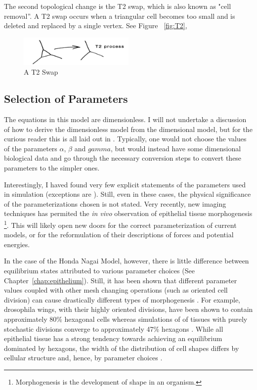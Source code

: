 The second topological change is the T2 swap, which is also known as "cell removal''. A T2 swap occurs when a triangular cell becomes too small and is deleted and replaced by a single vertex. See Figure ~\ref{fig:T2},

\begin{figure}
\centering
\includegraphics[width=0.5\textwidth]{../diagrams/t2.png}
\caption{A T2 Swap}
\label{fig:t2}
\end{figure}

\subsection{Selection of Parameters}

The equations in this model are dimensionless. I will not undertake a discussion of how to derive the dimensionless model from the dimensional model, but for the curious reader this is all laid out in \cite{HondaNagai}. Typically, one would not choose the values of the parameters $\alpha$, $\beta$ and $gamma$, but would instead have some dimensional biological data and go through the necessary conversion steps to convert these parameters to the simpler ones\cite{NewOkuda}.

Interestingly, I haved found very few explicit statements of the parameters used in simulation (exceptions are \cite{WoundHealing}\cite{ChasteMain}\cite{NewOkuda}). Still, even in these cases, the physical significance of the parameterizations chosen is not stated. Very recently, new imaging techniques has permited the \emph{in vivo} observation of epithelial tissue morphogenesis \footnote{Morphogenesis is the development of shape in an organism.}\cite{Sokolow}\cite{Xiong}. This will likely open new doors for the correct parameterization of current models, or for the reformulation of their descriptions of forces and potential energies. 

In the case of the Honda Nagai Model, however, there is little difference between equilibrium states attributed to various parameter choices (See Chapter~\ref{chap:epithelium}). Still, it has been shown that different parameter values coupled with other mesh changing operations (such as oriented cell division) can cause drastically different types of morphogenesis \cite{Overview}. For example, drosophila wings, with their highly oriented divisions, have been shown to contain approximately 80\% hexagonal cells whereas simulations of of tissues with purely stochastic divisions converge to  approximately 47\% hexagons \cite{Epithelial Topology}. While all epithelial tissue has a strong tendency towards achieving an equilibrium dominated by hexagons, the width of the distribution of cell shapes differs by cellular structure and, hence, by parameter choices \cite{Soap}. 

